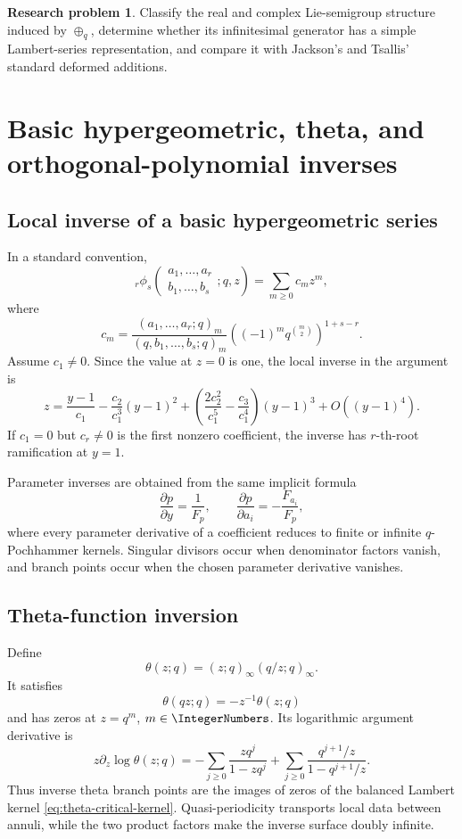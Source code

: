 \documentclass[11pt,oneside]{article}
\theoremstyle{definition}
\theoremstyle{remark}
\theoremstyle{plain}
\theoremstyle{definition}
\newtheorem{researchproblem}[theorem]{Research problem}
\theoremstyle{remark}
\numberwithin{equation}{section}
\numberwithin{figure}{section}
\numberwithin{table}{section}
\let\reporttopsection\section
\let\reportsubsection\subsection
\let\reportsubsubsection\subsubsection
\let\chapter\reporttopsection
\let\section\reportsubsection
\let\subsection\reportsubsubsection
\begin{document}
\begin{researchproblem}
Classify the real and complex Lie-semigroup structure induced by
\(\oplus_q\), determine whether its infinitesimal generator has a simple
Lambert-series representation, and compare it with Jackson's and Tsallis'
standard deformed additions.
\end{researchproblem}

\chapter{Basic hypergeometric, theta, and orthogonal-polynomial inverses}

\section{Local inverse of a basic hypergeometric series}
In a standard convention,
\[
 {}_r\phi_s\!\left(
 \begin{matrix}a_1,\ldots,a_r\\b_1,\ldots,b_s\end{matrix};q,z\right)
 =\sum_{m\ge0}c_mz^m,
\]
where
\[
 c_m=\frac{(a_1,\ldots,a_r;q)_m}
 {(q,b_1,\ldots,b_s;q)_m}
 \left((-1)^mq^{\binom m2}\right)^{1+s-r}.
\]
Assume \(c_1\ne0\).  Since the value at \(z=0\) is one, the local inverse in
the argument is
\begin{equation}
 z=\frac{y-1}{c_1}
 -\frac{c_2}{c_1^3}(y-1)^2
 +\left(\frac{2c_2^2}{c_1^5}-\frac{c_3}{c_1^4}\right)(y-1)^3
 +O((y-1)^4).
 \label{eq:basic-hypergeometric-inverse}
\end{equation}
If \(c_1=0\) but \(c_r\ne0\) is the first nonzero coefficient, the inverse has
\(r\)-th-root ramification at \(y=1\).

Parameter inverses are obtained from the same implicit formula
\[
 \frac{\partial p}{\partial y}=\frac1{F_p},
 \qquad
 \frac{\partial p}{\partial a_i}=-\frac{F_{a_i}}{F_p},
\]
where every parameter derivative of a coefficient reduces to finite or
infinite \(q\)-Pochhammer kernels.  Singular divisors occur when denominator
factors vanish, and branch points occur when the chosen parameter derivative
vanishes.

\section{Theta-function inversion}
Define
\[
 \theta(z;q)=(z;q)_\infty(q/z;q)_\infty.
\]
It satisfies
\[
 \theta(qz;q)=-z^{-1}\theta(z;q)
\]
and has zeros at \(z=q^m\), \(m\in\IntegerNumbers\).  Its logarithmic argument derivative is
\begin{equation}
 z\partial_z\log\theta(z;q)
 =-\sum_{j\ge0}\frac{zq^j}{1-zq^j}
 +\sum_{j\ge0}\frac{q^{j+1}/z}{1-q^{j+1}/z}.
 \label{eq:theta-critical-kernel}
\end{equation}
Thus inverse theta branch points are the images of zeros of the balanced
Lambert kernel \eqref{eq:theta-critical-kernel}.  Quasi-periodicity transports
local data between annuli, while the two product factors make the inverse
surface doubly infinite.
\end{document}
